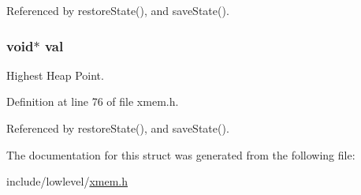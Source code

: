 Referenced by restore\-State(), and save\-State().

\hypertarget{struct_malloc_state_ab03f36f103bdec81305fd301f1f93885}{
\subsubsection[{val}]{\setlength{\rightskip}{0pt plus 5cm}void$\ast$ val}}\label{struct_malloc_state_ab03f36f103bdec81305fd301f1f93885}


Highest Heap Point. 



Definition at line 76 of file xmem.\-h.



Referenced by restore\-State(), and save\-State().



The documentation for this struct was generated from the following file\-:\begin{DoxyCompactItemize}
\item 
include/lowlevel/\hyperlink{xmem_8h}{xmem.\-h}\end{DoxyCompactItemize}
